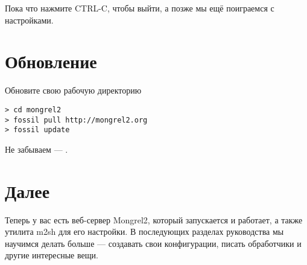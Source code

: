 Пока что нажмите CTRL-C, чтобы выйти, а позже мы ещё поиграемся с настройками.

\section{Обновление}
\begin{code}{Обновите свою рабочую директорию}
\begin{lstlisting}
> cd mongrel2
> fossil pull http://mongrel2.org
> fossil update
\end{lstlisting}
\end{code}

Не забываем --- .


\section{Далее}

Теперь у вас есть веб-сервер Mongrel2, который запускается и работает, а также
утилита m2sh для его настройки. В последующих разделах руководства мы
научимся делать больше --- создавать свои конфигурации, писать
обработчики и другие интересные вещи.
